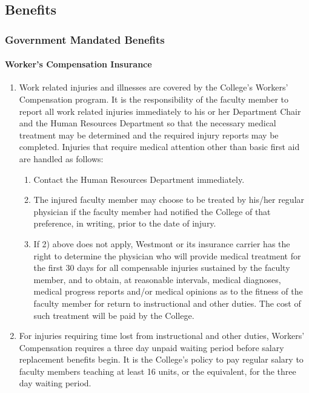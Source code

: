 	\subsection{Benefits}
		\subsubsection{Government Mandated Benefits}
			\label{sec:GovernmentMandatedBenefits}
			\paragraph{Worker's Compensation Insurance}
				\begin{enumerate}[label=\alph*)]
					\item{Work related injuries and illnesses are covered by the College's Workers' Compensation program.  It is the responsibility of the faculty member to report all work related injuries immediately to his or her Department Chair and the Human Resources Department so that the necessary medical treatment may be determined and the required injury reports may be completed. Injuries that require medical attention other than basic first aid are handled as follows:
						\begin{enumerate}[label=\arabic*)]
							\item{Contact the Human Resources Department immediately.}
							\item{The injured faculty member may choose to be treated by his/her regular physician if the faculty member had notified the College of that preference, in writing, prior to the date of injury.}
							\item{If 2) above does not apply, Westmont or its insurance carrier has the right to determine the physician who will provide medical treatment for the first 30 days for all compensable injuries sustained by the faculty member, and to obtain, at reasonable intervals, medical diagnoses, medical progress reports and/or medical opinions as to the fitness of the faculty member for return to instructional and other duties.  The cost of such treatment will be paid by the College.}
						\end{enumerate}
					}
					\item{For injuries requiring time lost from instructional and other duties, Workers' Compensation requires a three day unpaid waiting period before salary replacement benefits begin.  It is the College's policy to pay regular salary to faculty members teaching at least 16 units, or the equivalent, for the three day waiting period.}
				\end{enumerate}

